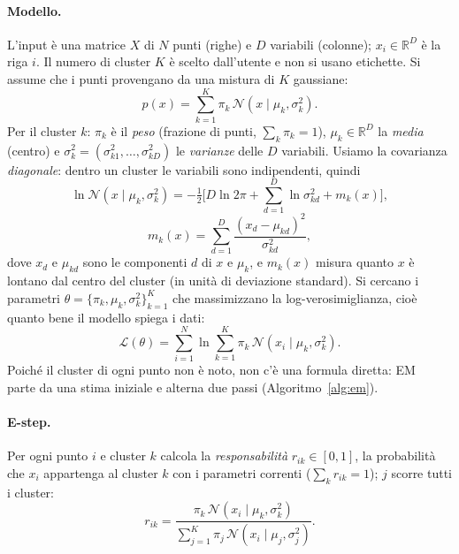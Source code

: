 \documentclass[conference]{IEEEtran}
\begin{document}
\paragraph{Modello.} L'input è una matrice $X$ di $N$ punti (righe) e $D$ variabili (colonne); $x_i\in\mathbb{R}^D$ è la riga $i$. Il numero di cluster $K$ è scelto dall'utente e non si usano etichette. Si assume che i punti provengano da una mistura di $K$ gaussiane:
\begin{equation}
p(x)=\sum_{k=1}^{K}\pi_k\,\mathcal{N}(x\mid\mu_k,\sigma_k^2).
\end{equation}
Per il cluster $k$: $\pi_k$ è il \emph{peso} (frazione di punti, $\sum_k\pi_k=1$), $\mu_k\in\mathbb{R}^D$ la \emph{media} (centro) e $\sigma^2_k=(\sigma^2_{k1},\dots,\sigma^2_{kD})$ le \emph{varianze} delle $D$ variabili. Usiamo la covarianza \emph{diagonale}: dentro un cluster le variabili sono indipendenti, quindi
\begin{equation}
\ln\mathcal{N}(x\mid\mu_k,\sigma_k^2)=-\tfrac12\Big[D\ln 2\pi+\sum_{d=1}^{D}\ln\sigma^2_{kd}+m_k(x)\Big],
\end{equation}
\begin{equation}
m_k(x)=\sum_{d=1}^{D}\frac{(x_d-\mu_{kd})^2}{\sigma^2_{kd}},
\end{equation}
dove $x_d$ e $\mu_{kd}$ sono le componenti $d$ di $x$ e $\mu_k$, e $m_k(x)$ misura quanto $x$ è lontano dal centro del cluster (in unità di deviazione standard). Si cercano i parametri $\theta=\{\pi_k,\mu_k,\sigma^2_k\}_{k=1}^{K}$ che massimizzano la log-verosimiglianza, cioè quanto bene il modello spiega i dati:
\begin{equation}
\mathcal{L}(\theta)=\sum_{i=1}^{N}\ln\sum_{k=1}^{K}\pi_k\,\mathcal{N}(x_i\mid\mu_k,\sigma_k^2).
\end{equation}
Poiché il cluster di ogni punto non è noto, non c'è una formula diretta: EM~\cite[Sez.~9.2.2]{bishop} parte da una stima iniziale e alterna due passi (Algoritmo~\ref{alg:em}).

\paragraph{E-step.} Per ogni punto $i$ e cluster $k$ calcola la \emph{responsabilità} $r_{ik}\in[0,1]$, la probabilità che $x_i$ appartenga al cluster $k$ con i parametri correnti ($\sum_k r_{ik}=1$); $j$ scorre tutti i cluster:
\begin{equation}
r_{ik}=\frac{\pi_k\,\mathcal{N}(x_i\mid\mu_k,\sigma_k^2)}{\sum_{j=1}^{K}\pi_j\,\mathcal{N}(x_i\mid\mu_j,\sigma_j^2)}.
\end{equation}
\end{document}
